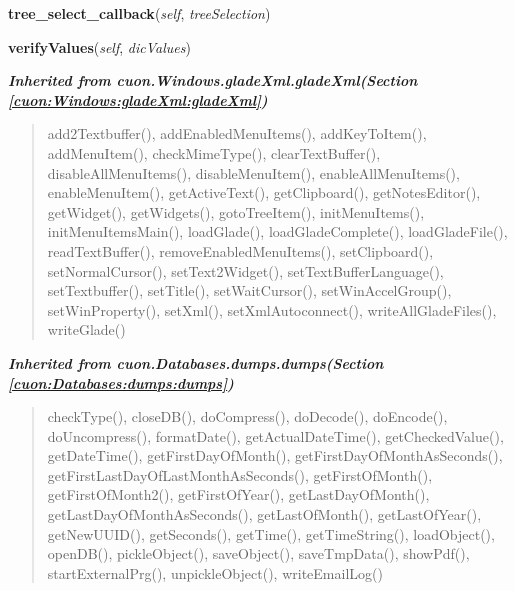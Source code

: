     \vspace{0.5ex}

\hspace{.8\funcindent}\begin{boxedminipage}{\funcwidth}

    \raggedright \textbf{tree\_select\_callback}(\textit{self}, \textit{treeSelection})

\setlength{\parskip}{2ex}
\setlength{\parskip}{1ex}
    \end{boxedminipage}

    \label{cuon:Databases:SingleData:SingleData:verifyValues}

    \vspace{0.5ex}

\hspace{.8\funcindent}\begin{boxedminipage}{\funcwidth}

    \raggedright \textbf{verifyValues}(\textit{self}, \textit{dicValues})

\setlength{\parskip}{2ex}
\setlength{\parskip}{1ex}
    \end{boxedminipage}


\large{\textbf{\textit{Inherited from cuon.Windows.gladeXml.gladeXml\textit{(Section \ref{cuon:Windows:gladeXml:gladeXml})}}}}

\begin{quote}
add2Textbuffer(), addEnabledMenuItems(), addKeyToItem(), addMenuItem(), checkMimeType(), clearTextBuffer(), disableAllMenuItems(), disableMenuItem(), enableAllMenuItems(), enableMenuItem(), getActiveText(), getClipboard(), getNotesEditor(), getWidget(), getWidgets(), gotoTreeItem(), initMenuItems(), initMenuItemsMain(), loadGlade(), loadGladeComplete(), loadGladeFile(), readTextBuffer(), removeEnabledMenuItems(), setClipboard(), setNormalCursor(), setText2Widget(), setTextBufferLanguage(), setTextbuffer(), setTitle(), setWaitCursor(), setWinAccelGroup(), setWinProperty(), setXml(), setXmlAutoconnect(), writeAllGladeFiles(), writeGlade()
\end{quote}

\large{\textbf{\textit{Inherited from cuon.Databases.dumps.dumps\textit{(Section \ref{cuon:Databases:dumps:dumps})}}}}

\begin{quote}
checkType(), closeDB(), doCompress(), doDecode(), doEncode(), doUncompress(), formatDate(), getActualDateTime(), getCheckedValue(), getDateTime(), getFirstDayOfMonth(), getFirstDayOfMonthAsSeconds(), getFirstLastDayOfLastMonthAsSeconds(), getFirstOfMonth(), getFirstOfMonth2(), getFirstOfYear(), getLastDayOfMonth(), getLastDayOfMonthAsSeconds(), getLastOfMonth(), getLastOfYear(), getNewUUID(), getSeconds(), getTime(), getTimeString(), loadObject(), openDB(), pickleObject(), saveObject(), saveTmpData(), showPdf(), startExternalPrg(), unpickleObject(), writeEmailLog()
\end{quote}

